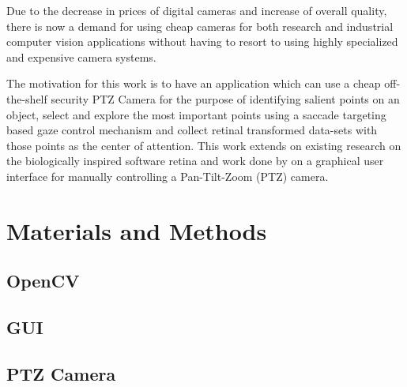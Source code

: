 \documentclass{l4proj}
\begin{document}
 Due to the decrease in prices of digital cameras and increase of overall quality, there is now a demand for using cheap cameras for both research and industrial computer vision applications without having to resort to using highly specialized and expensive camera systems. 

 The motivation for this work is to have an application which can use a cheap off-the-shelf security PTZ Camera for the purpose of identifying salient points on an object, select and explore the most important points using a saccade targeting based gaze control mechanism and collect retinal transformed data-sets with those points as the center of attention. This work extends on existing research on the biologically inspired software retina and work done by \citet{JianwenZhou} on a graphical user interface for manually controlling a Pan-Tilt-Zoom (PTZ) camera. 

\chapter{Materials and Methods}

\section{OpenCV}

\section{GUI}

\section{PTZ Camera}




\end{document}
